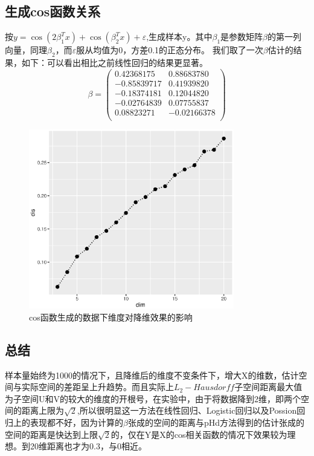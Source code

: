 \subsection{生成cos函数关系}
按$y=\cos(2\beta_1^Tx)+\cos(\beta_2^Tx)+\varepsilon$,生成样本y。其中$\beta_1$是参数矩阵$\beta$的第一列向量，同理$\beta_2$，而$\varepsilon$服从均值为0，方差0.1的正态分布。
我们取了一次$\beta$估计的结果，如下：可以看出相比之前线性回归的结果更显著。
\begin{equation}       %
    \beta= \left(                 %
       \begin{array}{cc}   %
        0.42368175 & 0.88683780 \\  %
        -0.85839717  & 0.41939820 \\  %
        -0.18374181  &0.12044820 \\
        -0.02764839 & 0.07755837 \\
        0.08823271 & -0.02166378 \\
       \end{array}
     \right)                 %
 \end{equation}
\begin{figure}[H]
    \centering
    \includegraphics[width=0.8\textwidth]{image/cos_phd.eps}
    \caption{cos函数生成的数据下维度对降维效果的影响}
\end{figure}

\subsection{总结}
样本量始终为1000的情况下，且降维后的维度不变条件下，增大X的维数，估计空间与实际空间的差距呈上升趋势。而且实际上$L_2-Hausdorff$子空间距离最大值为子空间U和V的较大的维度的开根号，在实验中，由于将数据降到2维，即两个空间的距离上限为$\sqrt{2}$,所以很明显这一方法在线性回归、Logistic回归以及Possion回归上的表现都不好，因为计算的$\beta$张成的空间的距离与pHd方法得到的估计张成的空间的距离是快达到上限$\sqrt{2}$的，仅在Y是X的cos相关函数的情况下效果较为理想。到20维距离也才为0.3，与0相近。


